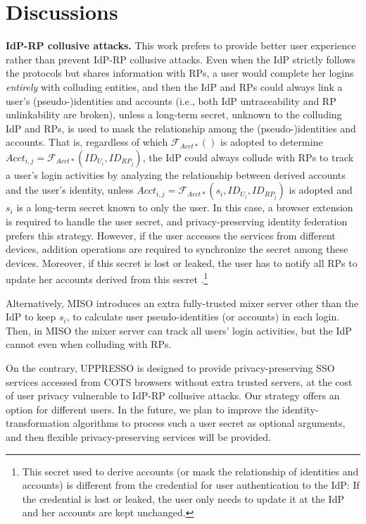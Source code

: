\section{Discussions}
\label{sec:discussion}

\noindent \textbf{IdP-RP collusive attacks.} 
This work prefers to provide better user experience rather than prevent IdP-RP collusive attacks.
Even when the IdP strictly follows the protocols but shares information with RPs,
    a user would complete her logins \emph{entirely} with colluding entities,
    and then the IdP and RPs could always link a user's (pseudo-)identities and accounts (i.e., both IdP untraceability and RP unlinkability are broken),
    unless a long-term secret, unknown to the colluding IdP and RPs,
                is used to mask the relationship among the (pseudo-)identities and accounts.
That is, regardless of which $\mathcal{F}_{Acct\ast}()$ is adopted to determine
$Acct_{i,j} = \mathcal{F}_{Acct\ast}(ID_{U_i}, ID_{RP_j})$,
the IdP could always collude with RPs to track a user's login activities by analyzing the relationship between derived accounts and the user's identity,
unless $Acct_{i,j} = \mathcal{F}_{Acct\ast}(s_i,ID_{U_i}, ID_{RP_j})$ is adopted and $s_i$ is a long-term secret known to only the user.
In this case,
    a browser extension is required
            to handle the user secret,
             and privacy-preserving identity federation \cite{ELPASSO, UnlimitID, idemix, PseudoID, uprov} prefers this strategy.
However, if the user accesses the services from different devices,
    addition operations are required to synchronize the secret among these devices.
Moreover, if this secret is lost or leaked, the user has to notify all RPs to update her accounts derived from this secret %
\cite{ELPASSO, UnlimitID}.\footnote{This secret used to derive accounts (or mask the relationship of identities and accounts) is different from the credential for user
authentication to the IdP: If the credential is lost or leaked, the user only needs to update it at the IdP and her accounts are kept unchanged.}

Alternatively, MISO \cite{miso} introduces an extra fully-trusted mixer server other than the IdP to keep $s_i$,
            to calculate user pseudo-identities (or accounts) in each login.
Then, in MISO the mixer server can track all users' login activities,
    but the IdP cannot even when colluding with RPs.

On the contrary,
    UPPRESSO is designed to provide privacy-preserving SSO services accessed from COTS browsers without extra trusted servers,
        at the cost of user privacy vulnerable to IdP-RP collusive attacks.
Our strategy offers an option for different users.
In the future, we plan to improve the identity-transformation algorithms
    to process such a user secret as optional arguments,
    and then flexible privacy-preserving services will be provided.

